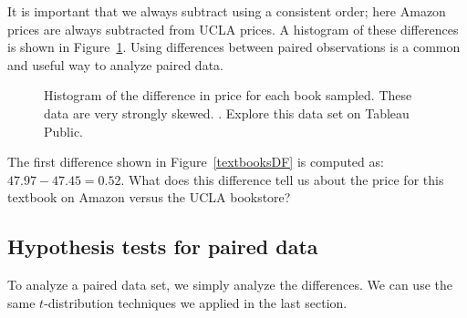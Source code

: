 It is important that we always subtract using
a consistent order;
here Amazon prices are always subtracted from UCLA prices.
A histogram of these differences is shown in
Figure~\ref{diffInTextbookPricesF18}.
Using differences between paired observations
is a common and useful way to analyze paired data.

\begin{figure}
\centering
{}
\caption{Histogram of the difference in price for
    each book sampled.
    These data are very strongly skewed.
    . Explore this data set on Tableau Public.}
\label{diffInTextbookPricesF18}
\end{figure}

\begin{exercisewrap}
\begin{nexercise}
The first difference shown in Figure~\ref{textbooksDF}
is computed as: $47.97 - 47.45 = 0.52$.
What does this difference tell us about the price for this textbook on Amazon versus the UCLA bookstore?\footnotemark
\end{nexercise}
\end{exercisewrap}


\subsection{Hypothesis tests for paired data}

To analyze a paired data set,
we simply analyze the differences.
We can use the same $t$-distribution techniques
we applied in the last section.

